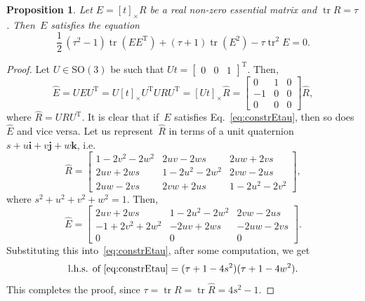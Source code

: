 \documentclass[reqno]{amsart}
\DeclareMathOperator{\tr}{tr}
\theoremstyle{plain}
\newtheorem{prop}{Proposition}
\begin{document}
\begin{prop}
\label{prop:constrEtau}
Let $E = [t]_\times R$ be a real non-zero essential matrix and $\tr R = \tau$. Then~$E$ satisfies the equation
\begin{equation}
\label{eq:constrEtau}
\frac{1}{2}\,(\tau^2 - 1)\tr(EE^{\mathrm T}) + (\tau + 1)\tr(E^2) - \tau\tr^2 E = 0.
\end{equation}
\end{prop}

\begin{proof}
Let $U \in \mathrm{SO}(3)$ be such that $Ut = \begin{bmatrix}0 & 0 & 1\end{bmatrix}^{\mathrm T}$. Then,
\begin{equation}
\hat E = UEU^{\mathrm T} = U[t]_\times U^{\mathrm T} URU^{\mathrm T} = [Ut]_\times \hat R = \begin{bmatrix}0 & 1 & 0\\ -1 & 0 & 0\\ 0 & 0 & 0\end{bmatrix} \hat R,
\end{equation}
where $\hat R = URU^{\mathrm T}$. It is clear that if~$E$ satisfies Eq.~\eqref{eq:constrEtau}, then so does~$\hat E$ and vice versa. Let us represent~$\hat R$ in terms of a unit quaternion $s + u\mathbf{i} + v\mathbf{j} + w\mathbf{k}$, i.e.
\begin{equation}
\hat R = \begin{bmatrix}1 - 2v^2 - 2w^2 & 2uv - 2ws & 2uw + 2vs \\ 2uv + 2ws & 1 - 2u^2 - 2w^2 & 2vw - 2us \\ 2uw - 2vs & 2vw + 2us & 1 - 2u^2 - 2v^2\end{bmatrix},
\end{equation}
where $s^2 + u^2 + v^2 + w^2 = 1$. Then,
\begin{equation}
\hat E = \begin{bmatrix}2uv + 2ws & 1 - 2u^2 - 2w^2 & 2vw - 2us \\ -1 + 2v^2 + 2w^2 & -2uv + 2ws & -2uw - 2vs \\ 0 & 0 & 0\end{bmatrix}.
\end{equation}
Substituting this into~\eqref{eq:constrEtau}, after some computation, we get
\begin{equation}
\text{l.h.s. of~\eqref{eq:constrEtau}} = (\tau + 1 - 4s^2)(\tau + 1 - 4w^2).
\end{equation}
This completes the proof, since $\tau = \tr R = \tr \hat R = 4s^2 - 1$.
\end{proof}
\end{document}

